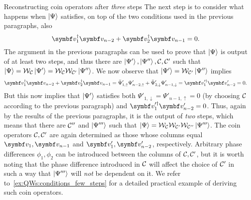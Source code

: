 \begin{examplebox}[label={ex:QWs:3steps_example}]{Reconstructing coin operators after \emph{three} steps}
The next step is to consider what happens when $\ket\Psi$ satisfies, on top of the two conditions used in the previous paragraphs, also
\begin{equation}
    \bs v_1^\dagger \bs v_{n-2}+\bs v_2^\dagger \bs v_{n-1}=0.
    \label{eq:QWs:orthogonality_on_vs_proving_otherdirection}
\end{equation}
The argument in the previous paragraphs can be used to prove that $\ket\Psi$ is output of at least two steps, and thus there are $\ket{\Psi'},\ket{\Psi''},{\mathcal{C}},{\mathcal{C}}'$ such that
$\ket\Psi={\mathcal{W}}_{\mathcal{C}}\ket{\Psi'}={\mathcal{W}}_{\mathcal{C}}{\mathcal{W}}_{{\mathcal{C}}'}\ket{\Psi''}$.
We now observe that $\ket{\Psi'}={\mathcal{W}}_{{\mathcal{C}}'}\ket{\Psi''}$ implies
\begin{equation}
    \bs v_1^\dagger \bs v_{n-2}+\bs v_2^\dagger \bs v_{n-1} =
    \bar\Psi'_{1,\uparrow}\Psi'_{n-2,\uparrow} +
    \bar\Psi'_{2,\downarrow}\Psi'_{n-1,\downarrow} =
    \bs v_1'^\dagger \bs v_{n-2}' = 0.
\end{equation}
But this now implies that $\ket{\Psi'}$ satisfies both $\Psi'_{1,\downarrow}=\Psi'_{n-1,\uparrow}=0$ (by choosing ${\mathcal{C}}$ according to the previous paragraph) and $\bs v_1'^\dagger \bs v'_{n-2}=0$. Thus, again by the results of the previous paragraphs, it is the output of \emph{two} steps, which means that there are ${\mathcal{C}}''$ and $\ket{\Psi'''}$ such that
$\ket\Psi={\mathcal{W}}_{\mathcal{C}}{\mathcal{W}}_{{\mathcal{C}}'}{\mathcal{W}}_{{\mathcal{C}}''}\ket{\Psi'''}$.
The coin operators ${\mathcal{C}},{\mathcal{C}}'$ are again determined as those whose columns equal $\bs v_1,\bs v_{n-1}$ and $\bs v_1',\bs v_{n-2}'$, respectively. Arbitrary phase differences $\phi_1,\phi_2$ can be introduced between the columns of ${\mathcal{C}},{\mathcal{C}}'$, but it is worth noting that the phase difference introduced in ${\mathcal{C}}$ will affect the choice of ${\mathcal{C}}'$ in such a way that $\ket{\Psi'''}$ will \emph{not} be dependent on it.
We refer to~\cref{ex:QWs:conditions_few_steps} for a detailed practical example of deriving such coin operators.
\end{examplebox}



